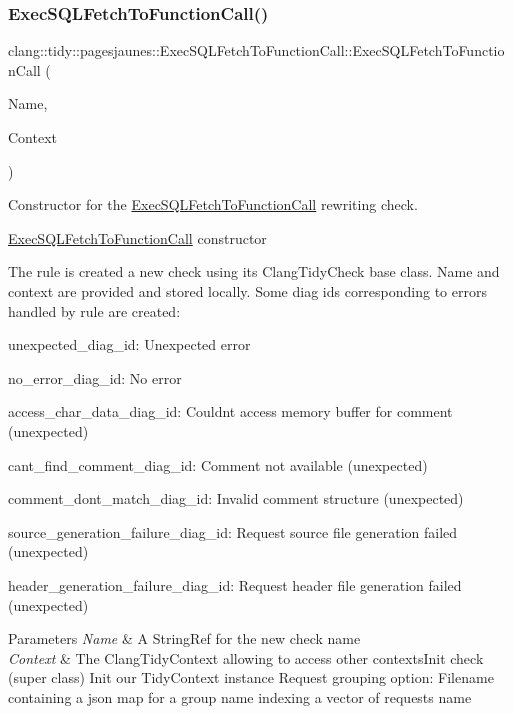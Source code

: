 \subsubsection{\texorpdfstring{Exec\+S\+Q\+L\+Fetch\+To\+Function\+Call()}{ExecSQLFetchToFunctionCall()}}
{\footnotesize\ttfamily clang\+::tidy\+::pagesjaunes\+::\+Exec\+S\+Q\+L\+Fetch\+To\+Function\+Call\+::\+Exec\+S\+Q\+L\+Fetch\+To\+Function\+Call (\begin{DoxyParamCaption}\item[{String\+Ref}]{Name,  }\item[{Clang\+Tidy\+Context $\ast$}]{Context }\end{DoxyParamCaption})}



Constructor for the \hyperlink{classclang_1_1tidy_1_1pagesjaunes_1_1_exec_s_q_l_fetch_to_function_call}{Exec\+S\+Q\+L\+Fetch\+To\+Function\+Call} rewriting check. 

\hyperlink{classclang_1_1tidy_1_1pagesjaunes_1_1_exec_s_q_l_fetch_to_function_call}{Exec\+S\+Q\+L\+Fetch\+To\+Function\+Call} constructor

The rule is created a new check using its {\ttfamily Clang\+Tidy\+Check} base class. Name and context are provided and stored locally. Some diag ids corresponding to errors handled by rule are created\+:
\begin{DoxyItemize}
\item unexpected\+\_\+diag\+\_\+id\+: Unexpected error
\item no\+\_\+error\+\_\+diag\+\_\+id\+: No error
\item access\+\_\+char\+\_\+data\+\_\+diag\+\_\+id\+: Couldn\textquotesingle{}t access memory buffer for comment (unexpected)
\item cant\+\_\+find\+\_\+comment\+\_\+diag\+\_\+id\+: Comment not available (unexpected)
\item comment\+\_\+dont\+\_\+match\+\_\+diag\+\_\+id\+: Invalid comment structure (unexpected)
\item source\+\_\+generation\+\_\+failure\+\_\+diag\+\_\+id\+: Request source file generation failed (unexpected)
\item header\+\_\+generation\+\_\+failure\+\_\+diag\+\_\+id\+: Request header file generation failed (unexpected)
\end{DoxyItemize}


\begin{DoxyParams}{Parameters}
{\em Name} & A String\+Ref for the new check name \\
\hline
{\em Context} & The Clang\+Tidy\+Context allowing to access other contexts\+Init check (super class) Init our Tidy\+Context instance Request grouping option\+: Filename containing a json map for a group name indexing a vector of requests name \\
\hline
\end{DoxyParams}



